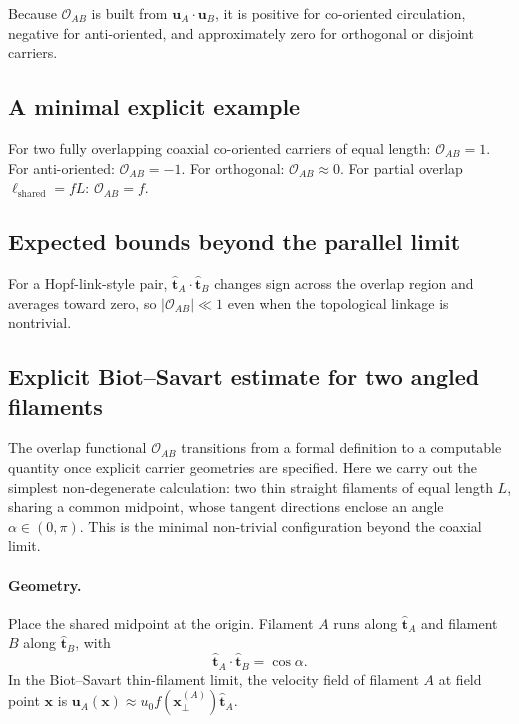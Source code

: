 \documentclass[11pt]{article}
\begin{document}
Because $\mathcal{O}_{AB}$ is built from $\mathbf{u}_A \cdot \mathbf{u}_B$, it is positive for co-oriented circulation, negative for anti-oriented, and approximately zero for orthogonal or disjoint carriers.

\subsection{A minimal explicit example}

For two fully overlapping coaxial co-oriented carriers of equal length: $\mathcal{O}_{AB} = 1$. For anti-oriented: $\mathcal{O}_{AB} = -1$. For orthogonal: $\mathcal{O}_{AB} \approx 0$. For partial overlap $\ell_{\mathrm{shared}} = fL$: $\mathcal{O}_{AB} = f$.

\subsection{Expected bounds beyond the parallel limit}

For a Hopf-link-style pair, $\hat{\mathbf{t}}_A \cdot \hat{\mathbf{t}}_B$ changes sign across the overlap region and averages toward zero, so $|\mathcal{O}_{AB}| \ll 1$ even when the topological linkage is nontrivial.

\subsection{Explicit Biot--Savart estimate for two angled filaments}
\label{subsec:biot_savart}

The overlap functional $\mathcal{O}_{AB}$ transitions from a formal definition to a computable quantity once explicit carrier geometries are specified. Here we carry out the simplest non-degenerate calculation: two thin straight filaments of equal length $L$, sharing a common midpoint, whose tangent directions enclose an angle $\alpha \in (0,\pi)$. This is the minimal non-trivial configuration beyond the coaxial limit.

\paragraph{Geometry.} Place the shared midpoint at the origin. Filament $A$ runs along $\hat{\mathbf{t}}_A$ and filament $B$ along $\hat{\mathbf{t}}_B$, with
\begin{equation}
    \hat{\mathbf{t}}_A \cdot \hat{\mathbf{t}}_B = \cos\alpha.
\end{equation}
In the Biot--Savart thin-filament limit, the velocity field of filament $A$ at field point $\mathbf{x}$ is $\mathbf{u}_A(\mathbf{x}) \approx u_0 f(\mathbf{x}_\perp^{(A)})\hat{\mathbf{t}}_A$.
\end{document}
